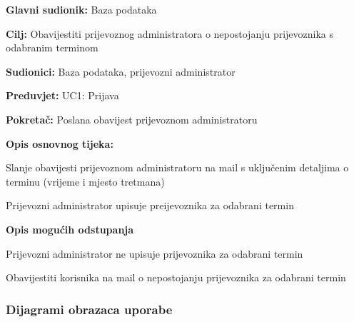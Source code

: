 					\noindent {}
					\begin{packed_item}
						
						\item \textbf{Glavni sudionik: } Baza podataka
						\item  \textbf{Cilj:} Obavijestiti prijevoznog administratora o nepostojanju prijevoznika s odabranim terminom
						\item  \textbf{Sudionici:} Baza podataka, prijevozni administrator
						\item  \textbf{Preduvjet:} UC1: Prijava
						\item \textbf{Pokretač: } Poslana obavijest prijevoznom administratoru
						\item  \textbf{Opis osnovnog tijeka:}
						
						\item[] \begin{packed_enum}
							
							\item Slanje obavijesti prijevoznom administratoru na mail s uključenim detaljima o terminu (vrijeme i mjesto tretmana)
							\item Prijevozni administrator upisuje preijevoznika za odabrani termin
						\end{packed_enum}
							\item \textbf{Opis mogućih odstupanja}
							
						\item[] \begin{packed_enum}
							\item[2.a] Prijevozni administrator ne upisuje prijevoznika za odabrani termin
							\item Obavijestiti korisnika na mail o nepostojanju prijevoznika za odabrani termin
						\end{packed_enum}
					\end{packed_item}
					
					
				\subsubsection{Dijagrami obrazaca uporabe}
					
